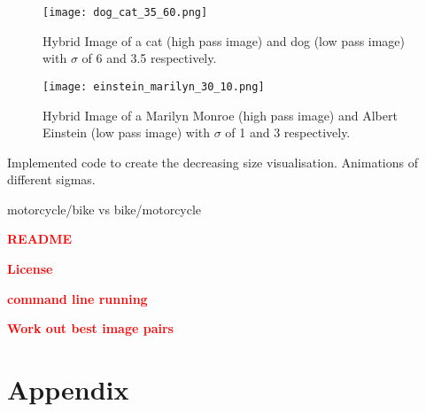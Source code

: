 \documentclass[a4paper,10pt]{article}
\newcommand{\todo}[1] {\textbf{\textcolor{red}{#1}}}
\begin{document}
\begin{figure}[ht!]
    \centering
    \texttt{[image: dog\_cat\_35\_60.png]}
    \caption{Hybrid Image of a cat (high pass image) and dog (low pass image)
             with $\sigma$ of 6 and 3.5 respectively. \label{fig:dog_cat}}
\end{figure}

\begin{figure}[ht!]
    \centering
    \texttt{[image: einstein\_marilyn\_30\_10.png]}
    \caption{Hybrid Image of a Marilyn Monroe (high pass image) and Albert Einstein (low pass image)
             with $\sigma$ of 1 and 3 respectively. \label{fig:einstein_marilyn}}
\end{figure}


Implemented code to create the decreasing size
visualisation. Animations of different sigmas.

motorcycle/bike vs bike/motorcycle

\todo{README}

\todo{License}

\todo{command line running}

\todo{Work out best image pairs}

\newpage
\section{Appendix}
\end{document}
